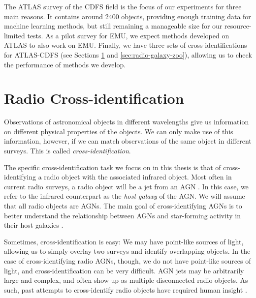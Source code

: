             The ATLAS survey of the CDFS field is the focus of our experiments
            for three main reasons. It contains around 2400 objects, providing
            enough training data for machine learning methods, but still
            remaining a manageable size for our resource-limited tests. As a
            pilot survey for EMU, we expect methods developed on ATLAS to also
            work on EMU. Finally, we have three sets of cross-identifications
            for ATLAS-CDFS (see Sections
            \ref{sec:radio-cross-identification} and
            \ref{sec:radio-galaxy-zoo}), allowing us to check the performance of
            methods we develop.

    \section{Radio Cross-identification}
    \label{sec:radio-cross-identification}


        Observations of astronomical objects in different wavelengths give us
        information on different physical properties of the objects. We can only
        make use of this information, however, if we can match observations of
        the same object in different surveys. This is called
        \emph{cross-identification}.

        The specific cross-identification task we focus on in this thesis is
        that of cross-identifying a radio object with the associated infrared
        object. Most often in current radio surveys, a radio object will be a
        jet from an AGN \citep{norris11}. In this case, we refer to the infrared
        counterpart as the \emph{host galaxy} of the AGN. We will assume that
        all radio objects are AGNs. The main goal of cross-identifying AGNs is
        to better understand the relationship between AGNs and star-forming
        activity in their host galaxies \citep{norris06}.

        Sometimes, cross-identification is easy: We may have point-like sources
        of light, allowing us to simply overlay two surveys and identify
        overlapping objects. In the case of cross-identifying radio AGNs,
        though, we do not have point-like sources of light, and
        cross-identification can be very difficult. AGN jets may be arbitrarily
        large and complex, and often show up as multiple disconnected radio
        objects. As such, past attempts to cross-identify radio objects have
        required human insight
        \citep{norris06,fan15}.

